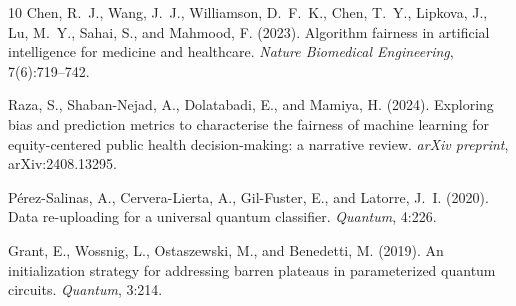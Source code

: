 \documentclass[12pt, letterpaper]{article}
\begin{document}
\begin{thebibliography}{10}
Chen, R.~J., Wang, J.~J., Williamson, D.~F.~K., Chen, T.~Y., Lipkova, J., Lu, M.~Y., Sahai, S., and Mahmood, F. (2023).
\newblock Algorithm fairness in artificial intelligence for medicine and healthcare.
\newblock \textit{Nature Biomedical Engineering}, 7(6):719--742.

Raza, S., Shaban-Nejad, A., Dolatabadi, E., and Mamiya, H. (2024).
\newblock Exploring bias and prediction metrics to characterise the fairness of machine learning for equity-centered public health decision-making: a narrative review.
\newblock \textit{arXiv preprint}, arXiv:2408.13295.

P\'{e}rez-Salinas, A., Cervera-Lierta, A., Gil-Fuster, E., and Latorre, J.~I. (2020).
\newblock Data re-uploading for a universal quantum classifier.
\newblock \textit{Quantum}, 4:226.

Grant, E., Wossnig, L., Ostaszewski, M., and Benedetti, M. (2019).
\newblock An initialization strategy for addressing barren plateaus in parameterized quantum circuits.
\newblock \textit{Quantum}, 3:214.

\end{thebibliography}
\end{document}
